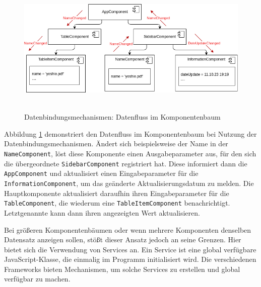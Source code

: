 \documentclass[12pt]{book}          %
\begin{document}
\begin{figure}[htbp]
\centering
\includegraphics[height=6.5cm]{abbildungen/components-sync-data-binding.png}
\caption{Datenbindungsmechanismen: Datenfluss im Komponentenbaum}
\label{components-sync-data-binding}
\end{figure}

Abbildung \ref{components-sync-data-binding} demonstriert den Datenfluss im Komponentenbaum bei Nutzung der Datenbindungsmechanismen. Ändert sich beispielsweise der Name in der \texttt{NameComponent}, löst diese Komponente einen Ausgabeparameter aus, für den sich die übergeordnete \texttt{SidebarComponent} registriert hat. Diese informiert dann die \texttt{AppComponent} und aktualisiert einen Eingabeparameter für die \texttt{InformationComponent}, um das geänderte Aktualisierungsdatum zu melden. Die Hauptkomponente aktualisiert daraufhin ihren Eingabeparameter für die \texttt{TableComponent}, die wiederum eine \texttt{TableItemComponent} benachrichtigt. Letztgenannte kann dann ihren angezeigten Wert aktualisieren.

Bei größeren Komponentenbäumen oder wenn mehrere Komponenten denselben Datensatz anzeigen sollen, stößt dieser Ansatz jedoch an seine Grenzen. Hier bietet sich die Verwendung von Services an. Ein Service ist eine global verfügbare JavaScript-Klasse, die einmalig im Programm initialisiert wird. Die verschiedenen Frameworks bieten Mechanismen, um solche Services zu erstellen und global verfügbar zu machen.
\end{document}
